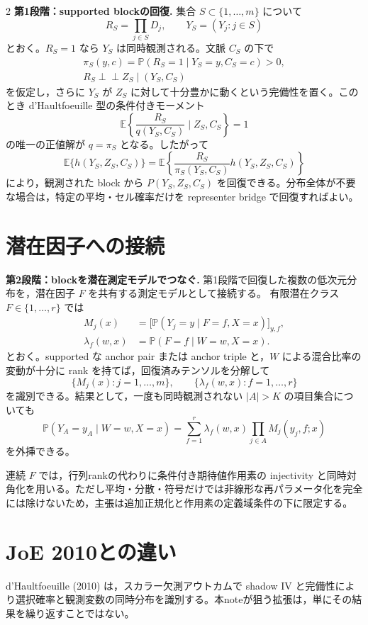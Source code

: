 \documentclass[a4paper,10pt]{article}
\newcommand{\E}{\mathbb E}
\newcommand{\Prb}{\mathbb P}
\newcommand{\indep}{\mathrel{\perp\!\!\!\perp}}
\begin{document}
\begin{multicols}{2}
\noindent\textbf{第1段階：supported blockの回復.}
集合 \(S\subset\{1,\ldots,m\}\) について
\[
  R_S=\prod_{j\in S}D_j,\qquad Y_S=(Y_j:j\in S)
\]
とおく。\(R_S=1\) なら \(Y_S\) は同時観測される。文脈 \(C_S\) の下で
\[
\begin{gathered}
\pi_S(y,c)=\Prb(R_S=1\mid Y_S=y,C_S=c)>0,\\
R_S\indep Z_S\mid(Y_S,C_S)
\end{gathered}
\]
を仮定し，さらに \(Y_S\) が \(Z_S\) に対して十分豊かに動くという完備性を置く。このとき d'Haultfoeuille 型の条件付きモーメント
\[
  \E\left\{\frac{R_S}{q(Y_S,C_S)}\mid Z_S,C_S\right\}=1
\]
の唯一の正値解が \(q=\pi_S\) となる。したがって
\[
  \E\{h(Y_S,Z_S,C_S)\}
  =
  \E\left\{
    \frac{R_S}{\pi_S(Y_S,C_S)}h(Y_S,Z_S,C_S)
  \right\}
\]
により，観測された block から \(P(Y_S,Z_S,C_S)\) を回復できる。分布全体が不要な場合は，特定の平均・セル確率だけを representer bridge で回復すればよい。

\columnbreak

\section{潜在因子への接続}
\noindent\textbf{第2段階：blockを潜在測定モデルでつなぐ.}
第1段階で回復した複数の低次元分布を，潜在因子 \(F\) を共有する測定モデルとして接続する。
有限潜在クラス \(F\in\{1,\ldots,r\}\) では
\[
\begin{aligned}
M_j(x)&=\bigl[\Prb(Y_j=y\mid F=f,X=x)\bigr]_{y,f},\\
\lambda_f(w,x)&=\Prb(F=f\mid W=w,X=x).
\end{aligned}
\]
とおく。supported な anchor pair または anchor triple と，\(W\) による混合比率の変動が十分に rank を持てば，回復済みテンソルを分解して
\[
  \{M_j(x):j=1,\ldots,m\},\qquad
  \{\lambda_f(w,x):f=1,\ldots,r\}
\]
を識別できる。結果として，一度も同時観測されない \(|A|>K\) の項目集合についても
\[
  \Prb(Y_A=y_A\mid W=w,X=x)
  =
  \sum_{f=1}^r \lambda_f(w,x)
  \prod_{j\in A} M_j(y_j,f;x)
\]
を外挿できる。

連続 \(F\) では，行列rankの代わりに条件付き期待値作用素の injectivity と同時対角化を用いる。ただし平均・分散・符号だけでは非線形な再パラメータ化を完全には除けないため，主張は追加正規化と作用素の定義域条件の下に限定する。

\section{JoE 2010との違い}
d'Haultfoeuille (2010) は，スカラー欠測アウトカムで shadow IV と完備性により選択確率と観測変数の同時分布を識別する。本noteが狙う拡張は，単にその結果を繰り返すことではない。


\end{multicols}
\end{document}
